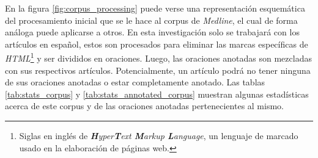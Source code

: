 En la figura \ref{fig:corpus_processing} puede verse una representación esquemática del procesamiento inicial que se le hace al corpus de \textit{Medline}, el cual de forma análoga puede aplicarse a otros. En esta investigación solo se trabajará con los artículos en español, estos son procesados para eliminar las marcas específicas de \textit{HTML}\footnote{Siglas en inglés de \textit{\textbf{H}yper\textbf{T}ext \textbf{M}arkup \textbf{L}anguage}, un lenguaje de marcado usado en la elaboración de páginas web.} y ser divididos en oraciones. Luego, las oraciones anotadas son mezcladas con sus respectivos artículos. Potencialmente, un artículo podrá no tener ninguna de sus oraciones anotadas o estar completamente anotado. Las tablas \ref{tab:stats_corpus} y \ref{tab:stats_annotated_corpus} muestran algunas estadísticas acerca de este corpus y de las oraciones anotadas pertenecientes al mismo.

